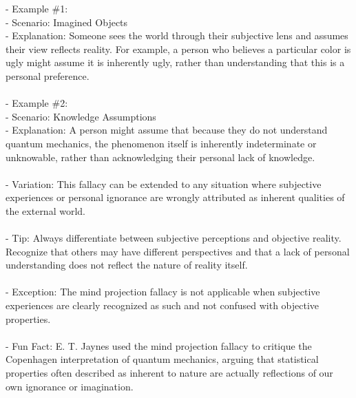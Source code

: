 \documentclass[a4paper,12pt,single,pdftex]{scrbook}
\begin{document}
{    
      - Example \#1:
    \\

    
        - Scenario: Imagined Objects
    \\

    
        - Explanation: Someone sees the world through their subjective lens and assumes their view reflects reality. For example, a person who believes a particular color is ugly might assume it is inherently ugly, rather than understanding that this is a personal preference.
    \\

    
      
    \\

    
      - Example \#2:
    \\

    
        - Scenario: Knowledge Assumptions
    \\

    
        - Explanation: A person might assume that because they do not understand quantum mechanics, the phenomenon itself is inherently indeterminate or unknowable, rather than acknowledging their personal lack of knowledge.
    \\

    
      
    \\

    
      - Variation: This fallacy can be extended to any situation where subjective experiences or personal ignorance are wrongly attributed as inherent qualities of the external world.
    \\

    
      
    \\

    
      - Tip: Always differentiate between subjective perceptions and objective reality. Recognize that others may have different perspectives and that a lack of personal understanding does not reflect the nature of reality itself.
    \\

    
      
    \\

    
      - Exception: The mind projection fallacy is not applicable when subjective experiences are clearly recognized as such and not confused with objective properties.
    \\

    
      
    \\

    
      - Fun Fact: E. T. Jaynes used the mind projection fallacy to critique the Copenhagen interpretation of quantum mechanics, arguing that statistical properties often described as inherent to nature are actually reflections of our own ignorance or imagination.
    \\

  }
\end{document}
